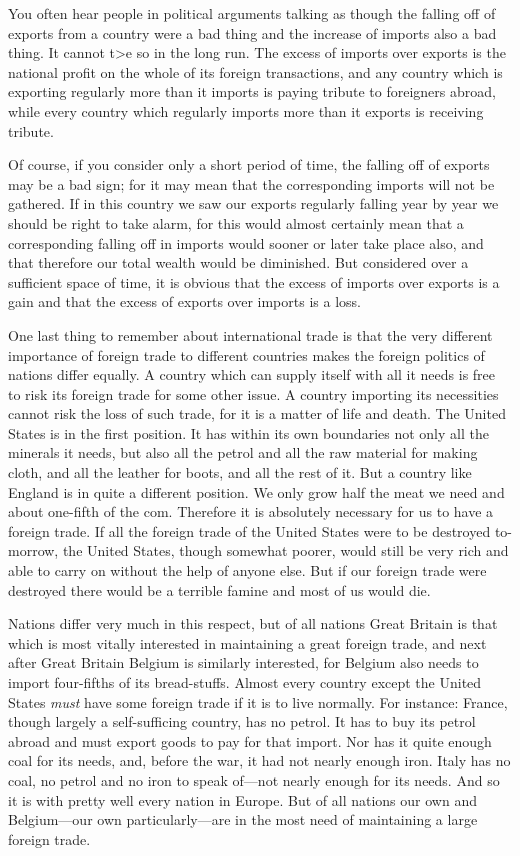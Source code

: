 \documentclass{book}
\begin{document}
You often hear people in political arguments talking as though the falling off of exports from a country were a bad thing and the increase of imports also a bad thing. It cannot t>e so in the long run. The excess of imports over exports is the national profit on the whole of its foreign transactions, and any country which is exporting regularly more than it imports is paying tribute to foreigners abroad, while every country which regularly imports more than it exports is receiving tribute.

Of course, if you consider only a short period of time, the falling off of exports may be a bad sign; for it may mean that the corresponding imports will not be gathered. If in this country we saw our exports regularly falling year by year we should be right to take alarm, for this would almost certainly mean that a corresponding falling off in imports would sooner or later take place also, and that therefore our total wealth would be diminished. But considered over a sufficient space of time, it is obvious that the excess of imports over exports is a gain and that the excess of exports over imports is a loss.

One last thing to remember about international trade is that the very different importance of foreign trade to different countries makes the foreign politics of nations differ equally. A country which can supply itself with all it needs is free to risk its foreign trade for some other issue. A country importing its necessities cannot risk the loss of such trade, for it is a matter of life and death. The United States is in the first position. It has within its own boundaries not only all the minerals it needs, but also all the petrol and all the raw material for making cloth, and all the leather for boots, and all the rest of it. But a country like England is in quite a different position. We only grow half the meat we need and about one-fifth of the com. Therefore it is absolutely necessary for us to have a foreign trade. If all the foreign trade of the United States were to be destroyed to-morrow, the United States, though somewhat poorer, would still be very rich and able to carry on without the help of anyone else. But if our foreign trade were destroyed there would be a terrible famine and most of us would die.

Nations differ very much in this respect, but of all nations Great Britain is that which is most vitally interested in maintaining a great foreign trade, and next after Great Britain Belgium is similarly interested, for Belgium also needs to import four-fifths of its bread-stuffs. Almost every country except the United States \emph{must} have some foreign trade if it is to live normally. For instance: France, though largely a self-sufficing country, has no petrol. It has to buy its petrol abroad and must export goods to pay for that import. Nor has it quite enough coal for its needs, and, before the war, it had not nearly enough iron. Italy has no coal, no petrol and no iron to speak of—not nearly enough for its needs. And so it is with pretty well every nation in Europe. But of all nations our own and Belgium—our own particularly—are in the most need of maintaining a large foreign trade.
\end{document}
